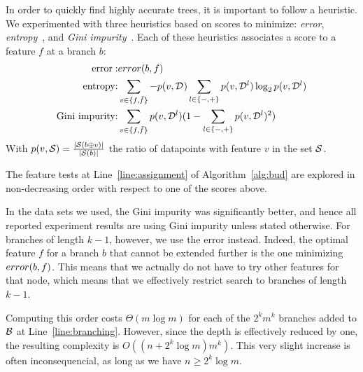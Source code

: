 \documentclass{llncs}
\def\posclass{+}
\def\negclass{-}
\def\datasymb{D}
\newcommand{\setex}[1]{\ensuremath{{\mathcal \datasymb}^{#1}}\xspace}
\newcommand{\allex}{{\setex{}}\xspace}
\newcommand{\bud}[0]{\ensuremath{{\cal B}}}
\newcommand{\afeat}[0]{\ensuremath{f}}
\newcommand{\aclass}[0]{\ensuremath{l}}
\newcommand{\error}[1][]{\ensuremath{\ifthenelse{\equal{#1}{}}{{error}}{{error({{#1}})}}}}
\newcommand{\abranch}[0]{\ensuremath{b}}
\newcommand{\numex}[0]{\ensuremath{n}}
\newcommand{\numfeat}[0]{\ensuremath{m}}
\newcommand{\mdepth}[0]{\ensuremath{k}}
\newcommand{\grow}[2]{\ensuremath{{#1}\oplus{#2}}}
\begin{document}
In order to quickly find highly accurate trees, it is important to follow a heuristic. We experimented with three heuristics based on scores to minimize: \emph{error}, \emph{entropy}~\cite{10.1023/A:1022643204877}, and \emph{Gini impurity}~\cite{breiman1984classification}. 
Each of these heuristics associates a score to a feature $\afeat$ at a branch $\abranch$:
\begin{eqnarray}
	\textrm{error}: & \error[\abranch,\afeat] \\
	\textrm{entropy:} & \sum\limits_{v \in \{\afeat,\bar{\afeat}\}} -p(v,\allex) \sum\limits_{\aclass \in \{\negclass,\posclass\}} p(v,\setex{\aclass}) \log_{2} p(v,\setex{\aclass}) \\
	\textrm{Gini impurity:} &  \sum\limits_{v \in \{\afeat,\bar{\afeat}\}} p(v,\setex{\aclass})(1 - \sum\limits_{\aclass \in \{\negclass,\posclass\}} p(v,\setex{\aclass})^2)
\end{eqnarray}
With $p(v,{\cal S}) = \frac{|{\cal S}(\grow{\abranch}{v})|}{|{\cal S}(\abranch)|}$ the ratio of datapoints with feature $v$ in the set ${\cal S}$.

The feature tests at Line~\ref{line:assignment} of Algorithm~\ref{alg:bud} are explored in non-decreasing order with respect to one of the scores above.


In the data sets we used, the Gini impurity was significantly better, and hence all reported experiment results are using Gini impurity unless stated otherwise. For branches of length $\mdepth-1$, however, we use the error instead. Indeed, the optimal feature $\afeat$ for a branch $\abranch$ that cannot be extended further is the one minimizing $\error[\abranch,\afeat]$. This means that we actually do not have to try other features for that node, which means that we effectively restrict search to branches of length $\mdepth-1$.


Computing this order costs $\Theta(\numfeat \log \numfeat)$ for each of the $2^{\mdepth}\numfeat^{\mdepth}$ branches added to $\bud$ at Line~\ref{line:branching}. However, since the depth is effectively reduced by one, the resulting complexity 
is $O((\numex + 2^{\mdepth} \log \numfeat) \numfeat^{\mdepth})$. This very slight increase is often inconsequencial, as long as we have $\numex \geq 2^{\mdepth} \log \numfeat$.
\end{document}
